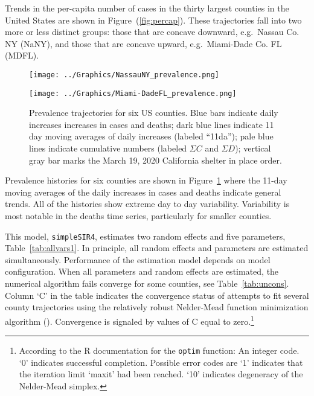 \documentclass[12pt,letterpaper]{article}
\newcommand\help[1]{\color{Magenta}{\it #1 }\normalcolor}
\newcommand\EG{e.g.\ }
\newcommand\SSm{{\tt simpleSIR4}}
\begin{document}

Trends in the per-capita number of cases in the thirty largest counties in the
United States are shown in Figure~(\ref{fig:percap}).
These trajectories fall into two more or less distinct groups: those
that are concave downward, \EG Nassau Co. NY (NaNY), and those that are
concave upward, \EG Miami-Dade Co. FL (MDFL).


\begin{figure}
{\scriptsize
\begin{center}
\texttt{[image: ../Graphics/NassauNY\_prevalence.png]}
 
\vspace{0.25truein}

\texttt{[image: ../Graphics/Miami-DadeFL\_prevalence.png]}
\end{center}
}
\caption{\label{fig:prev}
Prevalence trajectories for six US counties.
Blue bars indicate daily increases increases in cases and deaths;
dark blue lines indicate 11 day moving averages of daily increases
(labeled ``11da''); 
pale blue lines indicate cumulative numbers (labeled $\Sigma C$ and
$\Sigma D$); 
vertical gray bar marks the March 19, 2020 California shelter in place order.
\help{remove annotations.}
}
\end{figure}

Prevalence histories for six counties are shown in
Figure~\ref{fig:prev} where the 11-day moving averages of the daily
increases in cases and deaths indicate general trends.
All of the histories show extreme day to day variability.
Variability is most notable in the deaths
time series, particularly for smaller counties.

This model, \SSm , estimates two random effects and five
parameters, Table~\ref{tab:allvars1}.
In principle, all random effects and parameters are estimated
simultaneously.
Performance of the estimation model depends on
model configuration. When all parameters and random effects are
estimated, the numerical algorithm fails converge for some counties,
see Table~\ref{tab:uncons}. Column `C' in the table
indicates the convergence status of attempts to fit several county
trajectories using the relatively robust Nelder-Mead function
minimization algorithm (\cite{Baudin2010}).
Convergence is signaled by values of C equal to
zero.\footnote{According to the R documentation for the {\tt optim}
function: An integer code. ‘0’
indicates successful completion.  Possible error codes are
          ‘1’ indicates that the iteration limit ‘maxit’ had been
              reached.
          ‘10’ indicates degeneracy of the Nelder-Mead simplex.
}
\end{document}
